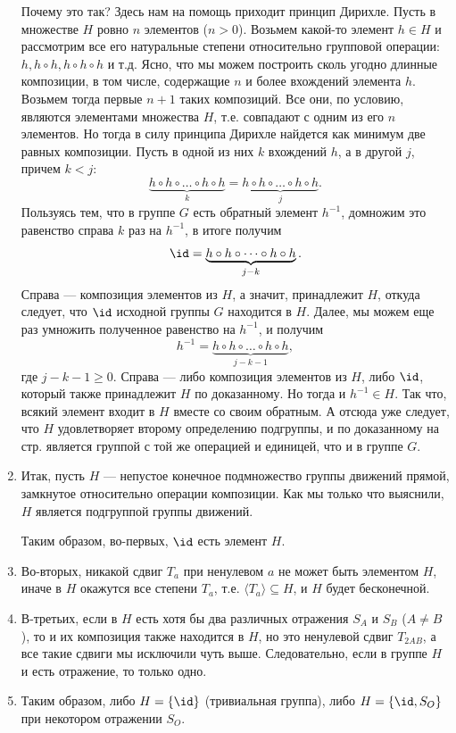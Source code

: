 \begin{enumerate}
Почему это так? Здесь нам на помощь приходит принцип Дирихле. Пусть в множестве $H$ ровно $n$ элементов ($n>0$). Возьмем какой-то элемент $h\in H$ и рассмотрим все его натуральные степени относительно групповой операции: $h, h\circ h, h\circ h\circ h$ и т.д. Ясно, что мы можем построить сколь угодно длинные композиции, в том числе, содержащие $n$ и более вхождений элемента $h$. Возьмем тогда первые $n+1$ таких композиций. Все они, по условию, являются элементами множества $H$, т.е. совпадают с одним из его $n$ элементов. Но тогда в силу принципа Дирихле найдется как минимум две равных композиции. Пусть в одной из них $k$ вхождений $h$, а в другой $j$, причем $k<j$:
$$
\underbrace{h\circ h\circ\dots\circ h\circ h}_{k} = \underbrace{h\circ h\circ\dots\circ h\circ h}_{j}.
$$
Пользуясь тем, что в группе $G$ есть обратный элемент $h^{-1}$, домножим это равенство справа $k$ раз на $h^{-1}$, в итоге получим
$$
\id = \underbrace{h\circ h\circ\dots\circ h\circ h}_{j-k}.
$$
Справа --- композиция элементов из $H$, а значит, принадлежит $H$, откуда следует, что $\id$ исходной группы $G$ находится в $H$. Далее, мы можем еще раз умножить полученное равенство на $h^{-1}$, и получим
$$
h^{-1} = \underbrace{h\circ h\circ\dots\circ h\circ h}_{j-k-1},
$$
где $j-k-1\ge 0$. Справа --- либо композиция элементов из $H$, либо $\id$, который также принадлежит $H$ по доказанному. Но тогда и $h^{-1}\in H$. Так что, всякий элемент входит в $H$ вместе со своим обратным. А отсюда уже следует, что $H$ удовлетворяет второму определению подгруппы, и по доказанному на стр. \pageref{Subgroup} является группой с той же операцией и единицей, что и в группе $G$.

\item Итак, пусть $H$ --- непустое конечное подмножество группы движений прямой, замкнутое относительно операции композиции. Как мы только что выяснили, $H$ является подгруппой группы движений.

Таким образом, во-первых, $\id$ есть элемент $H$.

\item Во-вторых, никакой сдвиг $T_a$ при ненулевом $a$ не может быть элементом $H$, иначе в $H$ окажутся все степени $T_a$, т.е. $\langle T_a\rangle \subseteq H$, и $H$ будет бесконечной.
\item В-третьих, если в $H$ есть хотя бы два различных отражения $S_A$ и $S_B$ ($A\ne B$), то и их композиция также находится в $H$, но это ненулевой сдвиг $T_{2AB}$, а все такие сдвиги мы исключили чуть выше. Следовательно, если в группе $H$ и есть отражение, то только одно.
\item Таким образом, либо $H=\{\id\}$ (тривиальная группа), либо $H=\{\id, S_O\}$ при некотором отражении $S_O$.
\end{enumerate}

